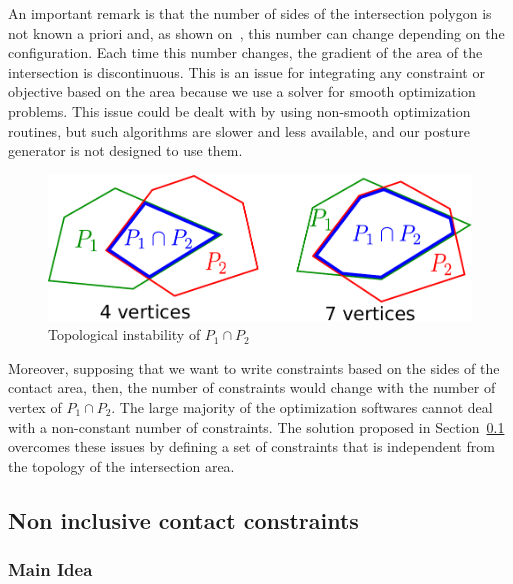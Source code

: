 An important remark is that the number of sides of the intersection polygon is not known a priori and, as shown on~, this number can change depending on the configuration.
Each time this number changes, the gradient of the area of the intersection is discontinuous.
This is an issue for integrating any constraint or objective based on the area because we use a solver for smooth optimization problems.
This issue could be dealt with by using non-smooth optimization routines, but such algorithms are slower and less available, and our posture generator is not designed to use them.
\begin{figure}[!htb]
  \centering
  \includegraphics[width=0.4\columnwidth]{polygon-inter.pdf}
  \caption{Topological instability of $P_1 \cap P_2$}
\label{fig:polygon-inter}
\end{figure}
Moreover, supposing that we want to write constraints based on the sides of the contact area, then, the number of constraints would change with the number of vertex of $P_1 \cap P_2$.
The large majority of the optimization softwares cannot deal with a non-constant number of constraints.
The solution proposed in Section~\ref{subsec:ellipse} overcomes these issues by defining a set of constraints that is independent from the topology of the intersection area.



\subsection{Non inclusive contact constraints}
\label{subsec:ellipse}




\subsubsection{Main Idea}
\label{subsubsec:idea}


